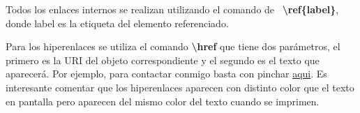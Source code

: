 Todos los enlaces internos se realizan utilizando el comando de \LaTeXe\ \textbf{\textbackslash ref\{label\}}, donde label es la etiqueta del elemento referenciado.

Para los hiperenlaces se utiliza el comando \textbf{\textbackslash href} que tiene dos parámetros, el primero es la URI del objeto correspondiente y el segundo es el texto que aparecerá. Por ejemplo, para contactar conmigo basta con pinchar \href{mailto:eloy.anguiano@uam.es?subject=[tfgtfmthesisuam] Consulta}{aqui}. Es interesante comentar que los hiperenlaces aparecen con distinto color que el texto en pantalla pero aparecen del mismo color del texto cuando se imprimen.
